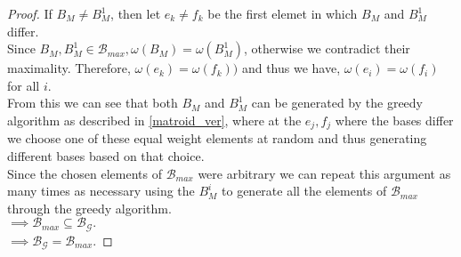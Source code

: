 \documentclass[../main.tex]{subfiles}
\begin{document}
\begin{proof}
If $B_M \neq B_M^{1}$, then let $e_k \neq f_k$ be the first elemet in which $B_M$ and $B_M^{1}$ differ.\\
Since $B_M,B_M^{1} \in \mathcal{B}_{max}, \omega(B_M) = \omega(B_M^{1})$, otherwise we contradict their maximality. Therefore, $\omega(e_k) = \omega(f_k))$ and thus we have, $\omega(e_i) = \omega(f_i)$ for all $i.$\\
\indent From this we can see that both $B_M$ and $B_M^{1}$ can be generated by the greedy algorithm as described in \ref{matroid_ver}, where at the $e_j,f_j$ where the bases differ we choose one of these equal weight elements at random and thus generating different bases based on that choice.\\
Since the chosen elements of $\mathcal{B}_{max}$ were arbitrary we can repeat this argument as many times as necessary using the $B_{M}^{i}$ to generate all the elements of $\mathcal{B}_{max}$ through the greedy algorithm.\\
$\implies \mathcal{B}_{max} \subseteq \mathcal{B_G}.$\\
$\implies \mathcal{B_G} = \mathcal{B}_{max}.$


\end{proof}
\end{document}
